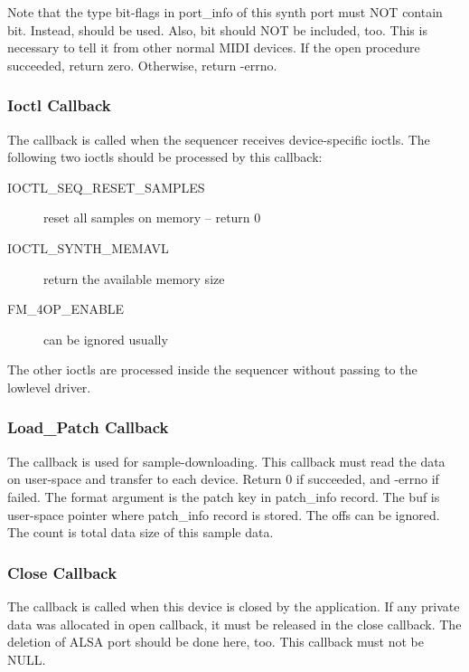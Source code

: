 \documentclass[a4paper,8pt,english]{sphinxmanual}
\begin{document}
Note that the type bit-flags in port\_info of this synth port must NOT contain
bit. Instead,  should be used. Also, 
bit should NOT be included, too. This is necessary to tell it from other
normal MIDI devices. If the open procedure succeeded, return zero. Otherwise,
return -errno.


\subsubsection{Ioctl Callback}
\label{sound/designs/seq-oss:ioctl-callback}
The  callback is called when the sequencer receives device-specific
ioctls. The following two ioctls should be processed by this callback:
\begin{description}
\item[{IOCTL\_SEQ\_RESET\_SAMPLES}] \leavevmode
reset all samples on memory -- return 0

\item[{IOCTL\_SYNTH\_MEMAVL}] \leavevmode
return the available memory size

\item[{FM\_4OP\_ENABLE}] \leavevmode
can be ignored usually

\end{description}

The other ioctls are processed inside the sequencer without passing to
the lowlevel driver.


\subsubsection{Load\_Patch Callback}
\label{sound/designs/seq-oss:load-patch-callback}
The  callback is used for sample-downloading. This callback
must read the data on user-space and transfer to each device. Return 0
if succeeded, and -errno if failed. The format argument is the patch key
in patch\_info record. The buf is user-space pointer where patch\_info record
is stored. The offs can be ignored. The count is total data size of this
sample data.


\subsubsection{Close Callback}
\label{sound/designs/seq-oss:close-callback}
The  callback is called when this device is closed by the
application. If any private data was allocated in open callback, it must
be released in the close callback. The deletion of ALSA port should be
done here, too. This callback must not be NULL.
\end{document}
